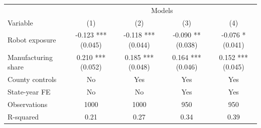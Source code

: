 \begin{table}[htbp]
\centering
\begin{tabular}{lcccc}
\hline
 & \multicolumn{4}{c}{Models} \\
Variable & (1) & (2) & (3) & (4) \\
Robot exposure & -0.123 *** (0.045) & -0.118 *** (0.044) & -0.090 ** (0.038) & -0.076 * (0.041) \\
Manufacturing share & 0.210 *** (0.052) & 0.185 *** (0.048) & 0.164 *** (0.046) & 0.152 *** (0.045) \\
County controls & No & Yes & Yes & Yes \\
State-year FE & No & No & Yes & Yes \\
Observations & 1000 & 1000 & 950 & 950 \\
R-squared & 0.21 & 0.27 & 0.34 & 0.39 \\
\hline
\end{tabular}
\end{table}
